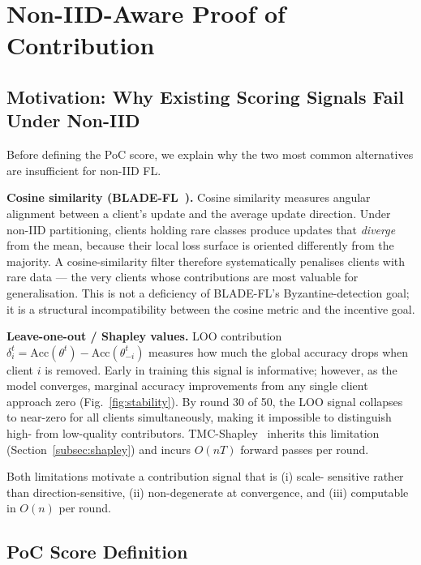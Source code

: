 \documentclass[journal]{IEEEtran}
\theoremstyle{definition}
\theoremstyle{remark}
\begin{document}
\section{Non-IID-Aware Proof of Contribution}
\label{sec:poc}

\subsection{Motivation: Why Existing Scoring Signals Fail Under Non-IID}
\label{subsec:poc_motivation}

Before defining the PoC score, we explain why the two most common
alternatives are insufficient for non-IID FL.

\textbf{Cosine similarity (BLADE-FL~\cite{bladefl2022}).}
Cosine similarity measures angular alignment between a client's
update and the average update direction.
Under non-IID partitioning, clients holding rare classes produce
updates that \emph{diverge} from the mean, because their local loss
surface is oriented differently from the majority.
A cosine-similarity filter therefore systematically penalises
clients with rare data --- the very clients whose contributions are
most valuable for generalisation.
This is not a deficiency of BLADE-FL's Byzantine-detection goal;
it is a structural incompatibility between the cosine metric and
the incentive goal.

\textbf{Leave-one-out / Shapley values.}
LOO contribution $\delta_i^t = \mathrm{Acc}(\theta^t) -
\mathrm{Acc}(\theta_{-i}^t)$ measures how much the global accuracy
drops when client $i$ is removed.
Early in training this signal is informative; however, as the model
converges, marginal accuracy improvements from any single client
approach zero (Fig.~\ref{fig:stability}).
By round 30 of 50, the LOO signal collapses to near-zero for all
clients simultaneously, making it impossible to distinguish high-
from low-quality contributors.
TMC-Shapley~\cite{ghorbani2019data} inherits this limitation
(Section~\ref{subsec:shapley}) and incurs $O(nT)$ forward passes
per round.

Both limitations motivate a contribution signal that is (i) scale-
sensitive rather than direction-sensitive, (ii) non-degenerate at
convergence, and (iii) computable in $O(n)$ per round.

\subsection{PoC Score Definition}
\label{subsec:poc_def}
\end{document}
